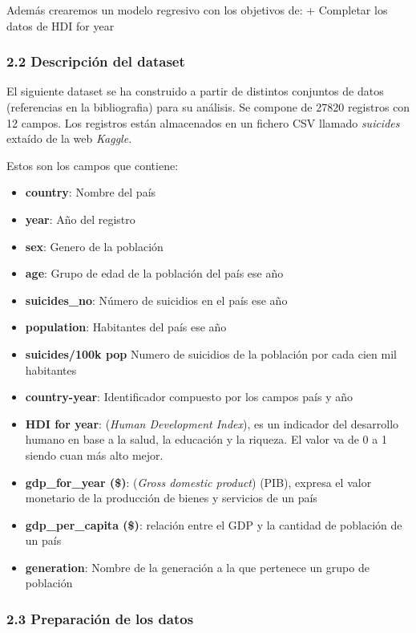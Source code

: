 \documentclass[]{article}
\providecommand{\tightlist}{%
  \setlength{\itemsep}{0pt}\setlength{\parskip}{0pt}}
\begin{document}
Además crearemos un modelo regresivo con los objetivos de: + Completar
los datos de HDI for year

\hypertarget{descripcion-del-dataset}{%
\subsubsection{2.2 Descripción del
dataset}\label{descripcion-del-dataset}}

El siguiente dataset se ha construido a partir de distintos conjuntos de
datos (referencias en la bibliografia) para su análisis. Se compone de
27820 registros con 12 campos. Los registros están almacenados en un
fichero CSV llamado \emph{suicides} extaído de la web \emph{Kaggle}.

Estos son los campos que contiene:

\begin{itemize}
\tightlist
\item
  \textbf{country}: Nombre del país
\item
  \textbf{year}: Año del registro
\item
  \textbf{sex}: Genero de la población
\item
  \textbf{age}: Grupo de edad de la población del país ese año
\item
  \textbf{suicides\_no}: Número de suicidios en el país ese año
\item
  \textbf{population}: Habitantes del país ese año
\item
  \textbf{suicides/100k pop} Numero de suicidios de la población por
  cada cien mil habitantes
\item
  \textbf{country-year}: Identificador compuesto por los campos país y
  año
\item
  \textbf{HDI for year}: (\emph{Human Development Index}), es un
  indicador del desarrollo humano en base a la salud, la educación y la
  riqueza. El valor va de 0 a 1 siendo cuan más alto mejor.
\item
  \textbf{gdp\_for\_year (\$)}: (\emph{Gross domestic product}) (PIB),
  expresa el valor monetario de la producción de bienes y servicios de
  un país
\item
  \textbf{gdp\_per\_capita (\$)}: relación entre el GDP y la cantidad de
  población de un país
\item
  \textbf{generation}: Nombre de la generación a la que pertenece un
  grupo de población
\end{itemize}

\hypertarget{preparacion-de-los-datos}{%
\subsubsection{2.3 Preparación de los
datos}\label{preparacion-de-los-datos}}
\end{document}
